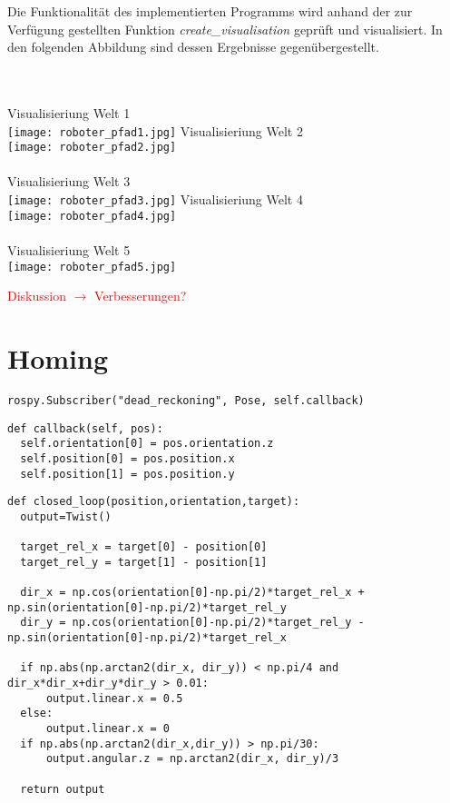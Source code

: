 \documentclass[12pt, a4paper]{report}
\begin{document}
Die Funktionalität des implementierten Programms wird anhand der zur Verfügung gestellten Funktion \textit{create\_visualisation} geprüft und visualisiert. In den folgenden Abbildung sind dessen Ergebnisse gegenübergestellt.\\\\\\\begin{centering}
Visualisieriung Welt 1\\
\texttt{[image: roboter\_pfad1.jpg]}\newpage
Visualisieriung Welt 2\\
\texttt{[image: roboter\_pfad2.jpg]}\\
~\\
Visualisieriung Welt 3\\
\texttt{[image: roboter\_pfad3.jpg]}\newpage
Visualisieriung Welt 4\\
\texttt{[image: roboter\_pfad4.jpg]}\\
~\\
Visualisieriung Welt 5\\
\texttt{[image: roboter\_pfad5.jpg]}\\
\end{centering}


\textcolor{red}{Diskussion $\rightarrow$ Verbesserungen?}
\newline

\section{Homing}
\begin{lstlisting}
rospy.Subscriber("dead_reckoning", Pose, self.callback)
\end{lstlisting}

\begin{lstlisting}
def callback(self, pos):
  self.orientation[0] = pos.orientation.z
  self.position[0] = pos.position.x
  self.position[1] = pos.position.y
\end{lstlisting}

\begin{lstlisting}
def closed_loop(position,orientation,target):
  output=Twist()

  target_rel_x = target[0] - position[0]
  target_rel_y = target[1] - position[1]

  dir_x = np.cos(orientation[0]-np.pi/2)*target_rel_x + np.sin(orientation[0]-np.pi/2)*target_rel_y
  dir_y = np.cos(orientation[0]-np.pi/2)*target_rel_y - np.sin(orientation[0]-np.pi/2)*target_rel_x

  if np.abs(np.arctan2(dir_x, dir_y)) < np.pi/4 and dir_x*dir_x+dir_y*dir_y > 0.01:
      output.linear.x = 0.5
  else:
      output.linear.x = 0
  if np.abs(np.arctan2(dir_x,dir_y)) > np.pi/30:
      output.angular.z = np.arctan2(dir_x, dir_y)/3

  return output
  
\end{lstlisting}
\end{document}
